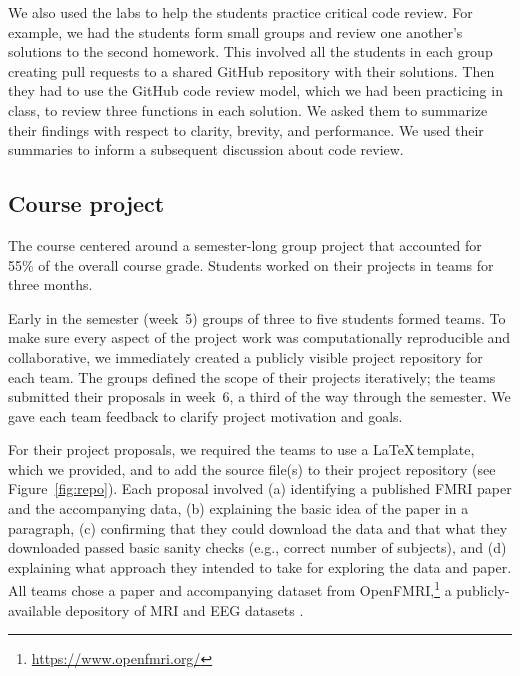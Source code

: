 We also used the labs to help the students practice critical code review.
For example, we had the students form small groups and review one another's
solutions to the second homework.
This involved all the students in each group creating pull requests to a
shared GitHub repository with their solutions.
Then they had to use the GitHub code review model, which we had been practicing
in class, to review three functions in each solution.
We asked them to summarize their findings with respect to
clarity, brevity, and performance.
We used their summaries to inform a subsequent discussion about code review.

\subsection{Course project}\label{project}

The course centered around a semester-long group project that accounted for 55\%
of the overall course grade.
Students worked on their projects in teams for three months.

Early in the semester (week~5) groups of three to five students formed teams.
To make sure every aspect of the project work was computationally
reproducible and collaborative, we immediately created a publicly visible
project repository for each team.
The groups defined the scope of their projects iteratively; the teams
submitted their proposals in week~6, a third of the way through the semester.
We gave each team feedback to clarify project motivation and goals.

For their project proposals, we required the teams to use a \LaTeX\,template,
which we provided, and to add the source file(s) to their project repository
(see Figure~\ref{fig:repo}).
Each proposal involved
(a) identifying a published FMRI paper and the accompanying data,
(b) explaining the basic idea of the paper in a paragraph,
(c) confirming that they could download the data and that what they
downloaded passed basic sanity checks (e.g., correct number of subjects), and
(d) explaining what approach they intended to take for exploring
the data and paper.
All teams chose a paper and accompanying dataset from
OpenFMRI,\footnote{\url{https://www.openfmri.org/}} a publicly-available
depository of MRI and EEG datasets
\citep{poldrack2013toward,poldrack2015openfmri}.

